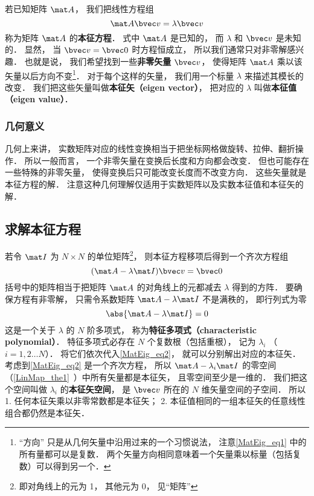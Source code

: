 

若已知矩阵 $\mat A$， 我们把线性方程组
\begin{equation}\label{MatEig_eq1}
\mat A \bvec v = \lambda \bvec v
\end{equation}
称为矩阵 $\mat A$ 的\textbf{本征方程}． 式中 $\mat A$ 是已知的， 而 $\lambda$ 和 $\bvec v$ 是未知的． 显然， 当 $\bvec v = \bvec 0$ 时方程恒成立， 所以我们通常只对非零解感兴趣． 也就是说， 我们希望找到一些\textbf{非零矢量} $\bvec v$， 使得矩阵 $\mat A$ 乘以该矢量以后方向不变\footnote{“方向” 只是从几何矢量中沿用过来的一个习惯说法， 注意\autoref{MatEig_eq1} 中的所有量都可以是复数． 两个矢量方向相同意味着一个矢量乘以标量（包括复数）可以得到另一个．}． 对于每个这样的矢量， 我们用一个标量 $\lambda$ 来描述其模长的改变． 我们把这些矢量叫做\textbf{本征矢（eigen vector）}， 把对应的 $\lambda$ 叫做\textbf{本征值（eigen value）}．

\subsubsection{几何意义}
几何上来讲， 实数矩阵对应的线性变换相当于把坐标网格做旋转、拉伸、翻折操作．%
所以一般而言， 一个非零矢量在变换后长度和方向都会改变． 但也可能存在一些特殊的非零矢量， 使得变换后只可能改变长度而不改变方向． 这些矢量就是本征方程的解． 注意这种几何理解仅适用于实数矩阵以及实数本征值和本征矢的解．

\subsection{求解本征方程}\label{MatEig_sub1}

若令 $\mat I$ 为 $N\times N$ 的单位矩阵\footnote{即对角线上的元为 1， 其他元为 0， 见“矩阵”}， 则本征方程移项后得到一个齐次方程组
\begin{equation}\label{MatEig_eq2}
(\mat A - \lambda\mat I)\bvec v = \bvec 0
\end{equation}
括号中的矩阵相当于把矩阵 $\mat A$ 的对角线上的元都减去 $\lambda$ 得到的方阵． 要确保方程有非零解， 只需令系数矩阵 $\mat A - \lambda\mat I$ 不是满秩的， 即行列式为零
\begin{equation}\label{MatEig_eq4}
\abs{\mat A - \lambda\mat I} = 0
\end{equation}
这是一个关于 $\lambda$ 的 $N$ 阶多项式， 称为\textbf{特征多项式（characteristic polynomial）}． 特征多项式必存在 $N$ 个复数根（包括重根），%
记为 $\lambda_i$ （$i = 1, 2\dots N$）． 将它们依次代入\autoref{MatEig_eq2}， 就可以分别解出对应的本征矢． 考虑到\autoref{MatEig_eq2} 是一个齐次方程， 所以 $\mat A - \lambda_i\mat I$ 的零空间（\autoref{LinMap_the1}~）中所有矢量都是本征矢， 且零空间至少是一维的． 我们把这个空间叫做 $\lambda_i$ 的\textbf{本征矢空间}， 是 $\bvec v$ 所在的 $N$ 维矢量空间的子空间． 所以 1. 任何本征矢乘以非零常数都是本征矢； 2. 本征值相同的一组本征矢的任意线性组合都仍然是本征矢．


